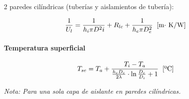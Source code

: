 \documentclass[11pt]{article}
\begin{document}
\begin{multicols*}{2}
            paredes cilíndricas (tuberías y aislamientos de tubería):

            \begin{equation}
                \frac{1}{U_l} = \frac{1}{h_i \pi D^2{i}} + R_{lc} + \frac{1}{h_e \pi D^2_e} \hspace{0.2cm} \text{[m$\cdot$ K/W]}
            \end{equation}

        \paragraph*{Temperatura superficial}

            \begin{equation}
                T_{se} = T_a + \frac{T_i - T_a}{\frac{h_e D_e}{2\lambda} \cdot \ln\frac{D_e}{D_i} + 1} \hspace{0.2cm} \text{[ºC]}
            \end{equation}

            \textit{Nota: Para una sola capa de aislante en paredes cilíndricas.}
            
    
    
\end{multicols*}

\end{document}
